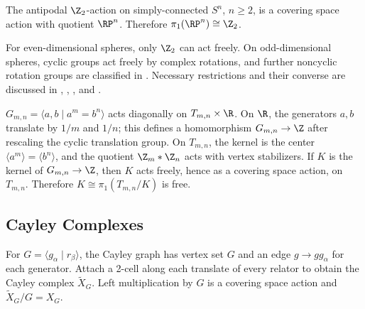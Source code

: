 \begin{example}
\label{ex:real-projective-space-covering}
The antipodal $\Z_2$-action on simply-connected $S^n$, $n\geq2$, is a
covering space action with quotient $\RP^n$. Therefore
$\pi_1(\RP^n)\cong\Z_2$.
\end{example}

For even-dimensional spheres, only $\Z_2$ can act freely. On odd-dimensional
spheres, cyclic groups act freely by complex rotations, and further noncyclic
rotation groups are classified in \cite{Wolf1984}. Necessary restrictions and
their converse are discussed in \cite{Milnor1957}, \cite{Brown1982},
\cite{MadsenThomasWall1976}, and \cite{DavisMilgram1985}.

\begin{example}
\label{ex:gmn-action-on-tree}
$G_{m,n}=\langle a,b\mid a^m=b^n\rangle$ acts diagonally on
$T_{m,n}\times\R$. On $\R$, the generators $a,b$ translate by $1/m$ and
$1/n$; this defines a homomorphism $G_{m,n}\to\Z$ after rescaling the cyclic
translation group. On $T_{m,n}$, the kernel is the center
$\langle a^m\rangle=\langle b^n\rangle$, and the quotient $\Z_m*\Z_n$ acts
with vertex stabilizers. If $K$ is the kernel of $G_{m,n}\to\Z$, then $K$
acts freely, hence as a covering space action, on $T_{m,n}$. Therefore
$K\cong\pi_1(T_{m,n}/K)$ is free.
\end{example}

\subsection*{Cayley Complexes}

\begin{definition}
\label{def:cayley-graph-and-complex}
\leanok
{}
For $G=\langle g_\alpha\mid r_\beta\rangle$, the Cayley graph has vertex set
$G$ and an edge $g\to gg_\alpha$ for each generator. Attach a 2-cell along
each translate of every relator to obtain the Cayley complex $\widetilde X_G$.
Left multiplication by $G$ is a covering space action and
$\widetilde X_G/G=X_G$.
\end{definition}

